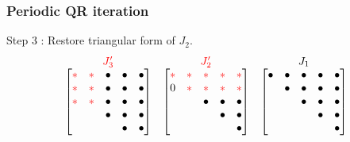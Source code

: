  \begin{frame}
   \frametitle{Periodic QR iteration}
   {\color{green} Step 3} :
   Restore triangular form of $J_2$.
   \[
   \begin{matrix}
     {\color{red} J'_3} & {\color{red}J'_2} &  J_1 \\
     \begin{bmatrix}
       \ch & \ch & \uch & \uch & \uch \\
       \ch & \ch & \uch & \uch & \uch \\
       \ch & \ch & \uch & \uch & \uch \\
       & & \uch & \uch & \uch \\
       & & & \uch & \uch \\
     \end{bmatrix}
     &
     \begin{bmatrix}
       \ch & \ch & \ch & \ch & \ch \\
       0 & \ch & \ch & \ch & \ch \\
       & & \uch & \uch & \uch \\
       & & & \uch & \uch \\
       & & & & \uch \\
     \end{bmatrix}
     &
     \begin{bmatrix}
       \uch & \uch & \uch & \uch & \uch \\
       & \uch & \uch & \uch & \uch \\
       & & \uch & \uch & \uch \\
       & & & \uch & \uch \\
       & & & & \uch \\
     \end{bmatrix}
   \end{matrix}
   \]
   

\end{frame}
